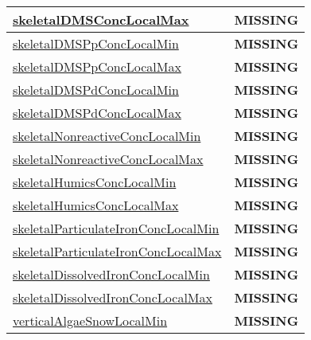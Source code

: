 {\begin{center}
\begin{longtable}{| p{2.0in} | p{4.0in} |}
    \hyperref[subsec:var_sec_tracer_monotonicity_skeletalDMSConcLocalMax]{skeletalDMSConcLocalMax} & {\bf \color{red} MISSING} \\
    \hline
    \hyperref[subsec:var_sec_tracer_monotonicity_skeletalDMSPpConcLocalMin]{skeletalDMSPpConcLocalMin} & {\bf \color{red} MISSING} \\
    \hline
    \hyperref[subsec:var_sec_tracer_monotonicity_skeletalDMSPpConcLocalMax]{skeletalDMSPpConcLocalMax} & {\bf \color{red} MISSING} \\
    \hline
    \hyperref[subsec:var_sec_tracer_monotonicity_skeletalDMSPdConcLocalMin]{skeletalDMSPdConcLocalMin} & {\bf \color{red} MISSING} \\
    \hline
    \hyperref[subsec:var_sec_tracer_monotonicity_skeletalDMSPdConcLocalMax]{skeletalDMSPdConcLocalMax} & {\bf \color{red} MISSING} \\
    \hline
    \hyperref[subsec:var_sec_tracer_monotonicity_skeletalNonreactiveConcLocalMin]{skeletalNonreactiveConcLocalMin} & {\bf \color{red} MISSING} \\
    \hline
    \hyperref[subsec:var_sec_tracer_monotonicity_skeletalNonreactiveConcLocalMax]{skeletalNonreactiveConcLocalMax} & {\bf \color{red} MISSING} \\
    \hline
    \hyperref[subsec:var_sec_tracer_monotonicity_skeletalHumicsConcLocalMin]{skeletalHumicsConcLocalMin} & {\bf \color{red} MISSING} \\
    \hline
    \hyperref[subsec:var_sec_tracer_monotonicity_skeletalHumicsConcLocalMax]{skeletalHumicsConcLocalMax} & {\bf \color{red} MISSING} \\
    \hline
    \hyperref[subsec:var_sec_tracer_monotonicity_skeletalParticulateIronConcLocalMin]{skeletalParticulateIronConcLocal\-Min} & {\bf \color{red} MISSING} \\
    \hline
    \hyperref[subsec:var_sec_tracer_monotonicity_skeletalParticulateIronConcLocalMax]{skeletalParticulateIronConcLocal\-Max} & {\bf \color{red} MISSING} \\
    \hline
    \hyperref[subsec:var_sec_tracer_monotonicity_skeletalDissolvedIronConcLocalMin]{skeletalDissolvedIronConcLocal\-Min} & {\bf \color{red} MISSING} \\
    \hline
    \hyperref[subsec:var_sec_tracer_monotonicity_skeletalDissolvedIronConcLocalMax]{skeletalDissolvedIronConcLocal\-Max} & {\bf \color{red} MISSING} \\
    \hline
    \hyperref[subsec:var_sec_tracer_monotonicity_verticalAlgaeSnowLocalMin]{verticalAlgaeSnowLocalMin} & {\bf \color{red} MISSING} \\

\end{longtable}
\end{center}}
